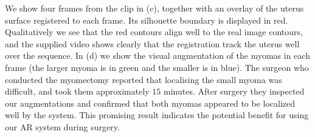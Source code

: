  We show four frames from the clip in (c), together with an overlay of the uterus surface registered to each frame. Its silhouette boundary is displayed in red. 
Qualitatively we see that the red contours align well to the real image contours, and the supplied video shows clearly that the registration track the uterus well over the sequence. In (d) we show the visual augmentation of the myomas in each frame (the larger myoma is in green and the smaller is in blue). The surgeon who conducted the myomectomy reported that localising the small myoma was difficult, and took them approximately $15$ minutes. After surgery they inspected our augmentations and confirmed that both myomas appeared to be localized well by the system. This promising result indicates the potential benefit for using our AR system during surgery.


